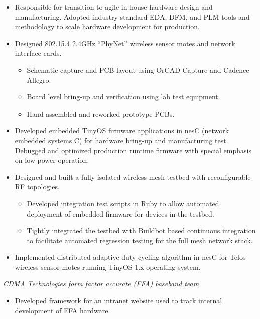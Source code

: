 \documentclass[11pt,a4paper]{moderncv}
\begin{document}
{
  \begin{itemize}
    \item Responsible for transition to agile in-house hardware design and manufacturing.  Adopted industry standard EDA, DFM, and PLM tools and methodology to scale hardware development for production.
    \item Designed 802.15.4 2.4GHz “PhyNet” wireless sensor motes and network interface cards.
      \begin{itemize}
        \item Schematic capture and PCB layout using OrCAD Capture and Cadence Allegro.
        \item Board level bring-up and verification using lab test equipment.
        \item Hand assembled and reworked prototype PCBs.
      \end{itemize}
    \item Developed embedded TinyOS firmware applications in nesC (network embedded systems C) for hardware bring-up and manufacturing test.  Debugged and optimized production runtime firmware with special emphasis on low power operation.
    \item Designed and built a fully isolated wireless mesh testbed with reconfigurable RF topologies.
    \begin{itemize}
      \item Developed integration test scripts in Ruby to allow automated deployment of embedded firmware for devices in the testbed.
      \item Tightly integrated the testbed with Buildbot based continuous integration to facilitate automated regression testing for the full mesh network stack.
    \end{itemize}
  \end{itemize}
}
{
  \begin{itemize}
    \item Implemented distributed adaptive duty cycling algorithm in nesC for Telos wireless sensor motes running TinyOS 1.x operating system.
  \end{itemize}
}
{
  \textit{CDMA Technologies form factor accurate (FFA) baseband team}
  \begin{itemize}
    \item Developed framework for an intranet website used to track internal development of FFA hardware.
  \end{itemize}
}
\end{document}
